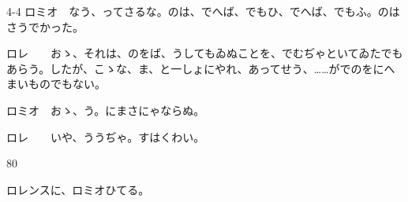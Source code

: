 \documentclass[tate,paper=b6j,jafontsize=9pt]{jlreq}
\begin{document}
\begin{azconvIndented}{4\zw}{-4\zw}
ロミオ　なう、ってさるな。のは、でへば、でもひ、でへば、でもふ。のはさうでかった。

ロレ　　おゝ、それは、のをば、うしてもゐぬことを、でむぢゃといてゐたでもあらう。したが、こゝな、ま、と一しょにやれ、あってせう、……がでのをにへまいものでもない。

ロミオ　おゝ、う。にまさにゃならぬ。

ロレ　　いや、ううぢゃ。すはくわい。

\end{azconvIndented}
\begin{azconvIndented}{8\zw}{0\zw}

ロレンスに、ロミオひてる。

\end{azconvIndented}

\end{document}

